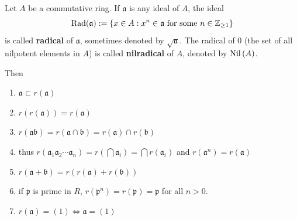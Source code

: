 \begin{definition}
    Let $A$ be a commutative ring.
    If $\mathfrak{a}$ is any ideal of $A$, the ideal
    \begin{equation*}
        \operatorname{\operatorname{Rad}}(\mathfrak{a})
        :=
        \left\{x \in A: x^n \in \mathfrak{a} \text { for some } n \in \mathbb{Z}_{\geq 1}\right\}
    \end{equation*}
    is called \textbf{radical} of $\mathfrak{a}$, sometimes denoted by $\sqrt{\mathfrak{a}}$.
    The radical of $0$ (the set of all nilpotent elements in $A$) is called \textbf{nilradical} of $A$, denoted by $\operatorname{\operatorname{Nil}}\left(A\right)$.
\end{definition}
\begin{proposition}
    \label{pro: operations of radical}
    Then
    \begin{enumerate}
        \item
              $\mathfrak{a} \subset r(\mathfrak{a})  $

        \item

              $r(r(\mathfrak{a}))=r(\mathfrak{a})$

        \item
              $r(\mathfrak{a b})=r(\mathfrak{a} \cap \mathfrak{b})=r(\mathfrak{a}) \cap r(\mathfrak{b})$

        \item

              thus $r\left(\mathfrak{a}_1\mathfrak{a}_2\cdots \mathfrak{a}_n\right)
                  =
                  r\left(\bigcap \mathfrak{a}_i\right)
                  =\bigcap r\left(\mathfrak{a}_i\right)
              $ and
              $r(\mathfrak{a}^n)=r(\mathfrak{a})$

        \item

              $r(\mathfrak{a}+\mathfrak{b})=r(r(\mathfrak{a})+r(\mathfrak{b}))$

        \item

              if $\mathfrak{p}$ is prime in $R$,
              $r\left(\mathfrak{p}^n\right)
                  =r\left(\mathfrak{p}\right)
                  =
                  \mathfrak{p}$ for all $n>0$.
        \item
              $r(\mathfrak{a})=(1) \Leftrightarrow \mathfrak{a}=(1)$
    \end{enumerate}
\end{proposition}


